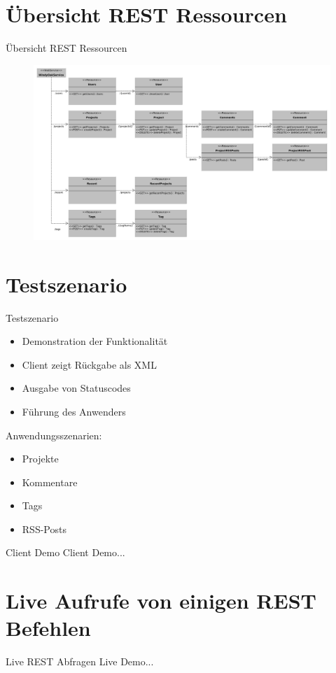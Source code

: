 \documentclass{beamer}
\begin{document}
	\section{Übersicht REST Ressourcen}
		\begin{frame}{Übersicht REST Ressourcen}
			\begin{figure}
				\centering
				\includegraphics[width=1.05\linewidth]{Bilder/rest.pdf}
			\end{figure}
		\end{frame}
	\section{Testszenario}
		\begin{frame}{Testszenario}
			\begin{itemize}
				\item Demonstration der Funktionalität
				\item Client zeigt Rückgabe als XML
				\item Ausgabe von Statuscodes
				\item Führung des Anwenders
			\end{itemize}
			\begin{block}{Anwendungsszenarien:}
				\begin{itemize}
					\item Projekte
					\item Kommentare
					\item Tags
					\item RSS-Posts
				\end{itemize}
			\end{block}
		\end{frame}
		\begin{frame}{Client Demo}
			Client Demo...
		\end{frame}
	\section{Live Aufrufe von einigen REST Befehlen}
		\begin{frame}{Live REST Abfragen}
			Live Demo...
		\end{frame}
\end{document}
